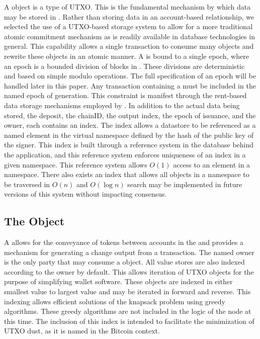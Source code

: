 A \DataStore{} object is a type of UTXO.
This is the fundamental mechanism by which data may be stored in
\LayerTwoLong{}.
Rather than storing data in an account-based relationship, we selected
the use of a UTXO-based storage system to allow for a more traditional
atomic commitment mechanism as is readily available in database
technologies in general.
This capability allows a single transaction to consume many \DataStore{}
objects and rewrite these objects in an atomic manner.
A \DataStore{} is bound to a single epoch, where an epoch is a bounded
division of blocks in \LayerTwoLong{}.
These divisions are deterministic and based on simple modulo operations.
The full specification of an epoch will be handled later in this paper.
Any transaction containing a \DataStore{} must be included in the named
epoch of generation.
This constraint is manifest through the rent-based data storage
mechanisms employed by \LayerTwo{}.
In addition to the actual data being stored, the deposit, the chainID,
the output index, the epoch of issuance, and the owner, each \DataStore{} contains
an index.
The index allows a datastore to be referenced as a named element in the
virtual namespace defined by the hash of the public key of the
\DataStore{} signer.
This index is built through a reference system in the database behind
the application, and this reference system enforces uniqueness of an
index in a given namespace.
This reference system allows $O(1)$ access to an element in a namespace.
There also exists an index that allows all objects in a namespace to be
traversed in $O(n)$ and $O(\log n)$ search may be implemented in future
versions of this system without impacting consensus.


\subsection{The \ValueStore{} Object}



A \ValueStore{} allows for the conveyance of \LayerTwoLong{} tokens between
accounts in the \LayerTwoLong{} and provides a mechanism for generating a
change output from a transaction.
The named owner is the only party that may consume a \ValueStore{} object.
All value stores are also indexed according to the owner by default.
This allows iteration of UTXO objects for the purpose of simplifying
wallet software.
These objects are indexed in either smallest value to largest value and
may be iterated in forward and reverse.
This indexing allows efficient solutions of the knapsack problem using
greedy algorithms.
These greedy algorithms are not included in the logic of the node at
this time.
The inclusion of this index is intended to facilitate the minimization
of UTXO dust, as it is named in the Bitcoin context.


